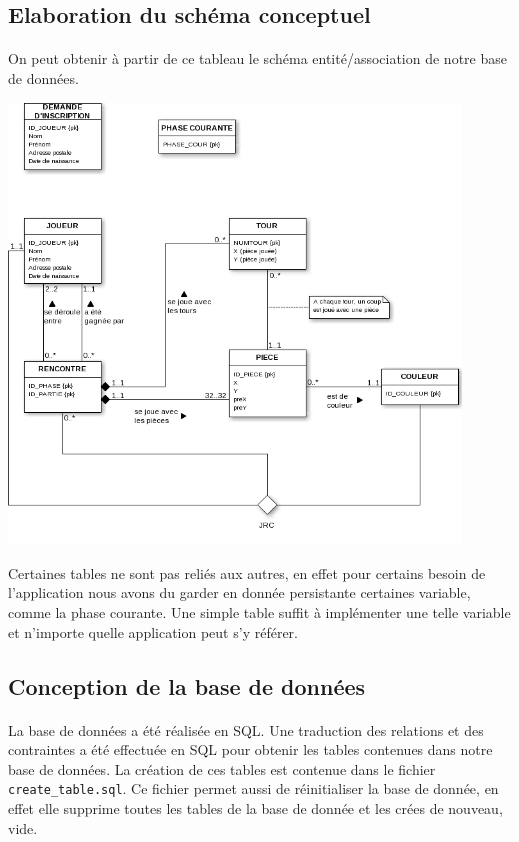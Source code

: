 \documentclass[10pt,a4paper]{report}
\begin{document}
\subsection{Elaboration du schéma conceptuel}
\paragraph{}
On peut obtenir à partir de ce tableau le schéma entité/association de notre base de données. \\
\begin{center}
\includegraphics[width=12cm]{DiagEntiteAsso.png}
\end{center}
\mbox{}\hspace{0.4cm}Certaines tables ne sont pas reliés aux autres, en effet pour certains besoin de l'application nous avons du garder en donnée persistante certaines variable, comme la phase courante. Une simple table suffit à implémenter une telle variable et n'importe quelle application peut s'y référer.\\

\subsection{Conception de la base de données}
\paragraph{}
La base de données a été réalisée en SQL. Une traduction des relations et des contraintes a été effectuée en SQL pour obtenir les tables
contenues dans notre base de données. La création de ces tables est contenue dans le fichier \lstinline!create_table.sql!.
Ce fichier permet aussi de réinitialiser la base de donnée, en effet elle supprime toutes les tables de la base de donnée et les crées de nouveau, 
vide.
\end{document}
